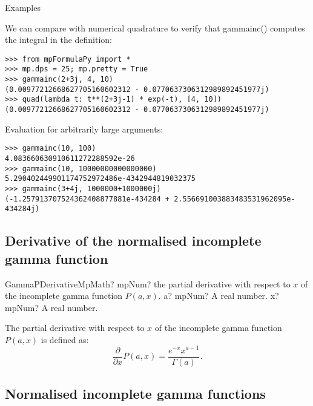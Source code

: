 Examples

We can compare with numerical quadrature to verify that gammainc() computes the integral in the definition:

\begin{lstlisting}
>>> from mpFormulaPy import *
>>> mp.dps = 25; mp.pretty = True
>>> gammainc(2+3j, 4, 10)
(0.00977212668627705160602312 - 0.0770637306312989892451977j)
>>> quad(lambda t: t**(2+3j-1) * exp(-t), [4, 10])
(0.00977212668627705160602312 - 0.0770637306312989892451977j)
\end{lstlisting}

Evaluation for arbitrarily large arguments:

\begin{lstlisting}
>>> gammainc(10, 100)
4.083660630910611272288592e-26
>>> gammainc(10, 10000000000000000)
5.290402449901174752972486e-4342944819032375
>>> gammainc(3+4j, 1000000+1000000j)
(-1.257913707524362408877881e-434284 + 2.556691003883483531962095e-434284j)
\end{lstlisting}




\subsection{Derivative  of the normalised incomplete gamma function}

\begin{mpFunctionsExtract}
	\mpFunctionTwoNotImplemented
	{GammaPDerivativeMpMath? mpNum? the partial derivative with respect to $x$ of the incomplete gamma function $P(a,x)$.}
	{a? mpNum? A real number.}
	{x? mpNum? A real number.}
\end{mpFunctionsExtract}

\vspace{0.3cm}
The partial derivative with respect to $x$ of the incomplete gamma function $P(a,x)$ is defined as:
\begin{equation}
\frac{\partial}{\partial x}P(a,x) = \frac{e^{-x} x^{a-1}}{\Gamma(a)}.
\end{equation}




\subsection{Normalised incomplete gamma functions}

